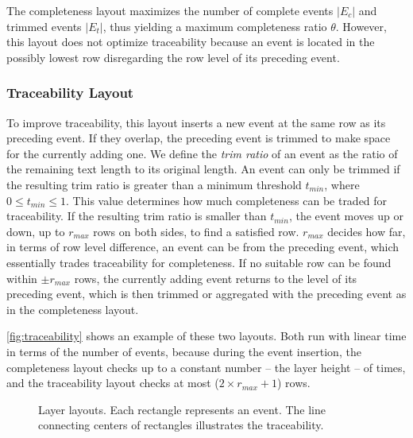 The completeness layout maximizes the number of complete events $|E_c|$ and trimmed events $|E_t|$, thus yielding a maximum completeness ratio $\theta$. However, this layout does not optimize traceability because an event is located in the possibly lowest row disregarding the row level of its preceding event.

\subsubsection{Traceability Layout}
To improve traceability, this layout inserts a new event at the same row as its preceding event. If they overlap, the preceding event is trimmed to make space for the currently adding one. We define the \emph{trim ratio} of an event as the ratio of the remaining text length to its original length. An event can only be trimmed if the resulting trim ratio is greater than a minimum threshold $t_{min}$, where $0\leq t_{min} \leq 1$. This value determines how much completeness can be traded for traceability. If the resulting trim ratio is smaller than $t_{min}$, the event moves up or down, up to $r_{max}$ rows on both sides, to find a satisfied row. $r_{max}$ decides how far, in terms of row level difference, an event can be from the preceding event, which essentially trades traceability for completeness. If no suitable row can be found within $\pm r_{max}$ rows, the currently adding event returns to the level of its preceding event, which is then trimmed or aggregated with the preceding event as in the completeness layout.

\autoref{fig:traceability} shows an example of these two layouts. Both  run with linear time in terms of the number of events, because during the event insertion, the completeness layout checks up to a constant number -- the layer height -- of times, and the traceability layout checks at most ($2 \times r_{max}+1$) rows.

\begin{figure}[!htb]
\centering
	\hfill
\caption{Layer layouts. Each rectangle represents an event. The line connecting centers of rectangles illustrates the  traceability.}
\label{fig:traceability}
\end{figure}

